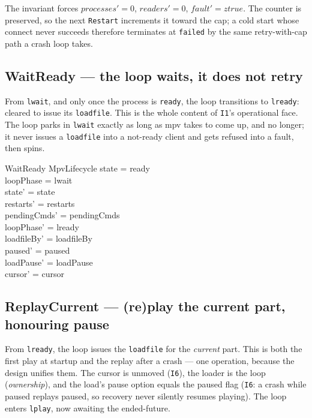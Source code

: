 \documentclass[a4paper,10pt,fleqn]{article}
\begin{document}
The invariant forces $processes' = 0$, $readers' = 0$, $fault' = ztrue$. The
counter is preserved, so the next \texttt{Restart} increments it toward the cap;
a cold start whose connect never succeeds therefore terminates at
\texttt{failed} by the same retry-with-cap path a crash loop takes.

\subsection{WaitReady --- the loop waits, it does not retry}
\label{sec:waitready}

From \texttt{lwait}, and only once the process is \texttt{ready}, the loop
transitions to \texttt{lready}: cleared to issue its \texttt{loadfile}. This is
the whole content of \texttt{I1}'s operational face. The loop parks in
\texttt{lwait} exactly as long as mpv takes to come up, and no longer; it never
issues a \texttt{loadfile} into a not-ready client and gets refused into a
fault, then spins.

\begin{schema}{WaitReady}
  \Delta MpvLifecycle
  \where
  state = ready \\
  loopPhase = lwait \\
  state' = state \\
  restarts' = restarts \\
  pendingCmds' = pendingCmds \\
  loopPhase' = lready \\
  loadfileBy' = loadfileBy \\
  paused' = paused \\
  loadPause' = loadPause \\
  cursor' = cursor
\end{schema}

\subsection{ReplayCurrent --- (re)play the current part, honouring pause}
\label{sec:replay}

From \texttt{lready}, the loop issues the \texttt{loadfile} for the
\emph{current} part. This is both the first play at startup and the replay
after a crash --- one operation, because the design unifies them. The cursor is
unmoved (\texttt{I6}), the loader is the loop (\emph{ownership}), and the load's
pause option equals the paused flag (\texttt{I6}: a crash while paused replays
paused, so recovery never silently resumes playing). The loop enters
\texttt{lplay}, now awaiting the ended-future.
\end{document}
